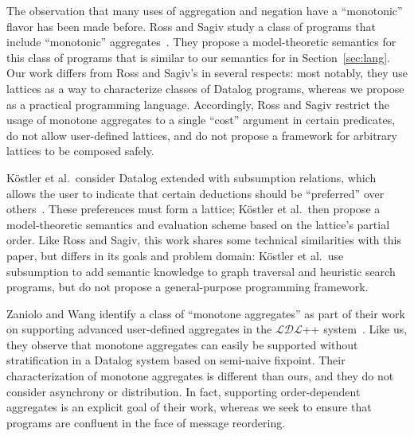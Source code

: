 The observation that many uses of aggregation and negation have a ``monotonic''
flavor has been made before. Ross and Sagiv study a class of programs that
include ``monotonic'' aggregates~\cite{Ross1992}. They propose a model-theoretic
semantics for this class of programs that is similar to our semantics for \lang
in Section~\ref{sec:lang}. Our work differs from Ross and Sagiv's in several
respects: most notably, they use lattices as a way to characterize classes of
Datalog programs, whereas we propose \lang as a practical programming
language. Accordingly, Ross and Sagiv restrict the usage of monotone aggregates
to a single ``cost'' argument in certain predicates, do not allow user-defined
lattices, and do not propose a framework for arbitrary lattices to be composed
safely.

K\"{o}stler et al.\ consider Datalog extended with subsumption relations, which
allows the user to indicate that certain deductions should be ``preferred'' over
others~\cite{Kostler1995}. These preferences must form a lattice; K\"{o}stler et
al.\ then propose a model-theoretic semantics and evaluation scheme based on the
lattice's partial order. Like Ross and Sagiv, this work shares some technical
similarities with this paper, but differs in its goals and problem domain:
K\"{o}stler et al.\ use subsumption to add semantic knowledge to graph traversal
and heuristic search programs, but do not propose a general-purpose programming
framework.

Zaniolo and Wang identify a class of ``monotone aggregates'' as part of their
work on supporting advanced user-defined aggregates in the $\mathcal{LDL}$++
system~\cite{Zaniolo1999}. Like us, they observe that monotone aggregates can
easily be supported without stratification in a Datalog system based on
semi-naive fixpoint. Their characterization of monotone aggregates is different
than ours, and they do not consider asynchrony or distribution.  In fact,
supporting order-dependent aggregates is an explicit goal of their work, whereas
we seek to ensure that programs are confluent in the face of message reordering.
